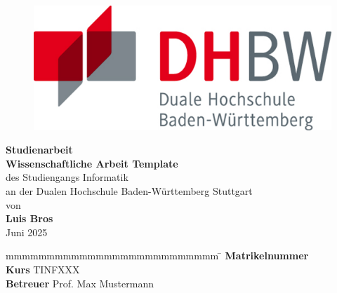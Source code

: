 \begin{titlepage}

    \begin{figure}

        \centering
        \begin{minipage}[t]{0.45\linewidth}
            \centering
            \includegraphics[width=.75\linewidth]{resources/DHBW}
        \end{minipage}

    \end{figure}

    \begin{center}
        \vspace*{12mm} {\LARGE\textbf{Studienarbeit}} \\
        \vspace*{12mm} {\large\textbf{Wissenschaftliche Arbeit Template}} \\
        \vspace*{12mm} {des Studiengangs Informatik} \\
        \vspace*{3mm} {an der Dualen Hochschule Baden-Württemberg Stuttgart} \\
        \vspace*{12mm} {von} \\
        \vspace*{3mm} {\textbf{Luis Bros}} \\
        \vspace*{12mm} {Juni 2025}\\
    \end{center}

    \vfill
    \begin{spacing}{1.2}
        \begin{tabbing}
            mmmmmmmmmmmmmmmmmmmmmmmmmm              \= \kill
            \textbf{Matrikelnummer}                 \\
            \textbf{Kurs}                           \> TINFXXX \\
            \textbf{Betreuer}                       \> Prof. Max Mustermann \\
        \end{tabbing}
    \end{spacing}

    \newpage

\end{titlepage}

\pagestyle{headings}